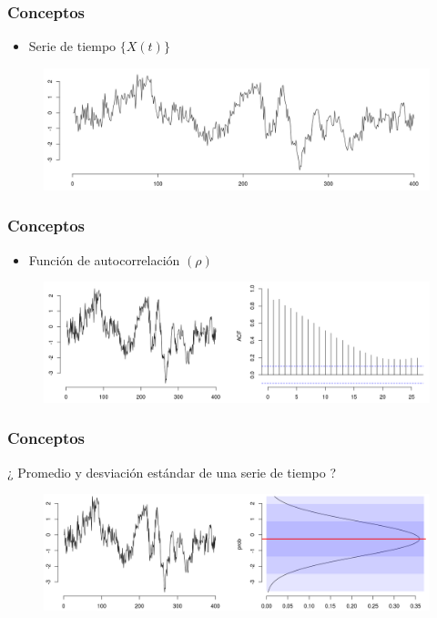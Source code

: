 \documentclass[11pt]{beamer}
\begin{document}

\begin{frame}\frametitle{Conceptos}
\begin{itemize}
\item Serie de tiempo $\{ X(t) \}$
\end{itemize}
\begin{figure}
\centering
\includegraphics[width=\linewidth]{./curso_scripts/tseries.png}
\end{figure}
\end{frame}


\begin{frame}\frametitle{Conceptos}
\begin{itemize}
\item Función de autocorrelación $(\rho)$
\end{itemize}
\begin{figure}
\centering
\includegraphics[width=\linewidth]{./curso_scripts/acf.png}
\end{figure}
\end{frame}


\begin{frame}\frametitle{Conceptos}
¿ Promedio y desviación estándar de una serie de tiempo ?
\begin{figure}
\centering
\includegraphics[width=\linewidth]{./curso_scripts/mu_x.png}
\end{figure}
\end{frame}
\end{document}
